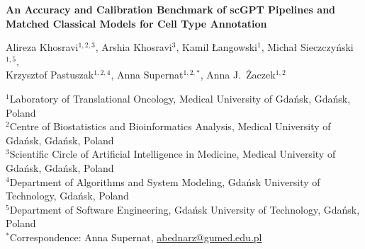 \documentclass[11pt,a4paper]{article}
\begin{document}
\begin{titlepage}
\begin{center}
\vspace*{0.8cm}
{\LARGE\bfseries An Accuracy and Calibration Benchmark of scGPT Pipelines and Matched Classical Models for Cell Type Annotation\par}
\vspace{1.2cm}
{\large
Alireza Khosravi$^{1,2,3}$, Arshia Khosravi$^{3}$, Kamil {\L}angowski$^{1}$, Micha{\l} Sieczczy{\'n}ski$^{1,5}$,\\[4pt]
Krzysztof Pastuszak$^{1,2,4}$, Anna Supernat$^{1,2,*}$, Anna J.~{\.Z}aczek$^{1,2}$\par}
\vspace{0.8cm}
\begin{minipage}{0.92\textwidth}
\small
$^{1}$Laboratory of Translational Oncology, Medical University of Gda\'nsk, Gda\'nsk, Poland\\
$^{2}$Centre of Biostatistics and Bioinformatics Analysis, Medical University of Gda\'nsk, Gda\'nsk, Poland\\
$^{3}$Scientific Circle of Artificial Intelligence in Medicine, Medical University of Gda\'nsk, Gda\'nsk, Poland\\
$^{4}$Department of Algorithms and System Modeling, Gda\'nsk University of Technology, Gda\'nsk, Poland\\
$^{5}$Department of Software Engineering, Gda\'nsk University of Technology, Gda\'nsk, Poland\\[5pt]
$^{*}$Correspondence: Anna Supernat, \href{mailto:abednarz@gumed.edu.pl}{abednarz@gumed.edu.pl}
\end{minipage}
\vspace{1.0cm}
\end{center}


\end{titlepage}
\end{document}
